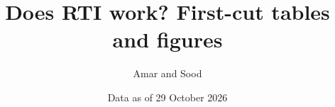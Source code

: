 \documentclass[11pt]{article}
\title{Does RTI work? First-cut tables and figures}
\author{Amar and Sood}
\date{Data as of 29 October 2026}
\begin{document}
\maketitle

\FloatBarrier

\FloatBarrier

\FloatBarrier

\FloatBarrier

\FloatBarrier

\FloatBarrier

\FloatBarrier

\FloatBarrier

\FloatBarrier

\FloatBarrier

\FloatBarrier

\FloatBarrier

\FloatBarrier

\FloatBarrier

\FloatBarrier

\FloatBarrier

\FloatBarrier

\FloatBarrier

\FloatBarrier

\FloatBarrier
\end{document}
